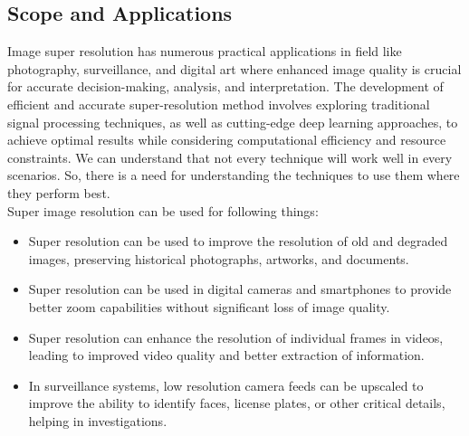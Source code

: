 \subsection{Scope and Applications}
Image super resolution has numerous practical applications in field
like photography, surveillance, and digital art where enhanced image quality is crucial
for accurate decision-making, analysis, and interpretation. The development of efficient
and accurate super-resolution method involves exploring traditional signal processing
techniques, as well as cutting-edge deep learning approaches, to achieve optimal results
while considering computational efficiency and resource constraints. We can understand that not every technique will work well in every scenarios. So, there is a need for understanding the techniques to use them where they perform best.\\
Super image resolution can be used for following things: 
\begin{itemize}
    \item Super resolution can be used to improve the resolution of old and degraded
    images, preserving historical photographs, artworks, and documents. 
    \item Super resolution can be used in digital cameras and smartphones to provide
    better zoom capabilities without significant loss of image quality.
    \item Super resolution can enhance the resolution of individual frames in videos,
    leading to improved video quality and better extraction of information. 
    \item In surveillance systems, low resolution camera feeds can be upscaled to improve
    the ability to identify faces, license plates, or other critical details, helping in
    investigations. 
    
\end{itemize}
